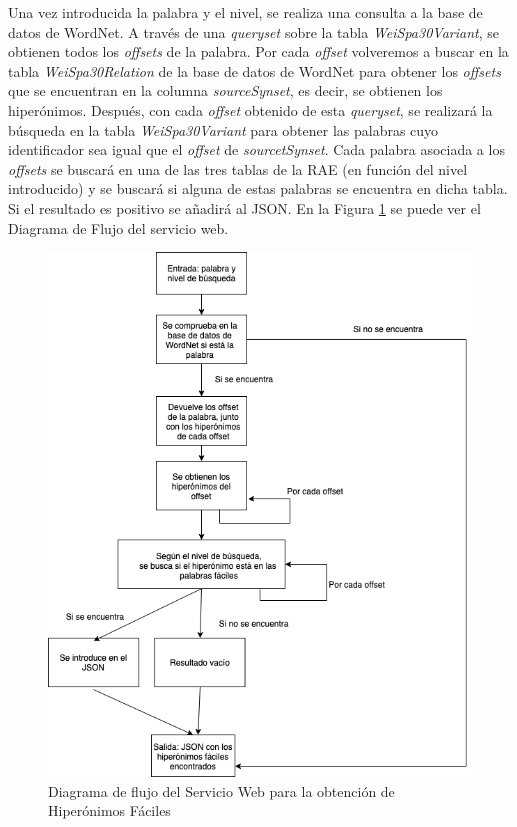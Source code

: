 Una vez introducida la palabra y el nivel, se realiza una consulta a la base de datos de WordNet. A través de una \textit{queryset} sobre la tabla \textit{WeiSpa30Variant}, se obtienen todos los \textit{offsets} de la palabra.
Por cada \textit{offset} volveremos a buscar en la tabla \textit{WeiSpa30Relation} de la base de datos de WordNet para obtener los \textit{offsets} que se encuentran en la columna \textit{sourceSynset}, es decir, se obtienen los hiperónimos. Después, con cada \textit{offset} obtenido de esta \textit{queryset}, se realizará la búsqueda en la tabla \textit{WeiSpa30Variant} para obtener las palabras cuyo identificador sea igual que el \textit{offset} de \textit{sourcetSynset}.
Cada palabra asociada a los \textit{offsets} se buscará en una de las tres tablas de la RAE (en función del nivel introducido) y se buscará si alguna de estas palabras se encuentra en dicha tabla.
Si el resultado es positivo se añadirá al JSON.
En la Figura \ref{fig:swhiperonimos} se puede ver el Diagrama de Flujo del servicio web.
\begin{figure}[!h]
	\includegraphics[width=.9\textwidth]{Imagenes/Bitmap/Capitulo4/ServiciosWeb/DiagramaFlujoHiperonimos.png}
	\centering
	\caption{Diagrama de flujo del Servicio Web para la obtención de Hiperónimos Fáciles}
	\label{fig:swhiperonimos}
\end{figure}

